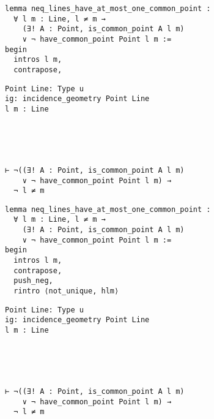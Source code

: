 \begin{frame}[fragile]
	\begin{multicols}{2}
		\begin{lstlisting}
lemma neq_lines_have_at_most_one_common_point :
  ∀ l m : Line, l ≠ m → 
    (∃! A : Point, is_common_point A l m) 
    ∨ ¬ have_common_point Point l m := 
begin
  intros l m,
  contrapose,
\end{lstlisting}
		\columnbreak
		\begin{lstlisting}
Point Line: Type u
ig: incidence_geometry Point Line
l m : Line





⊢ ¬((∃! A : Point, is_common_point A l m) 
    ∨ ¬ have_common_point Point l m) → 
  ¬ l ≠ m
		\end{lstlisting}
	\end{multicols}
\end{frame}










\begin{frame}[fragile]
	\begin{multicols}{2}
		\begin{lstlisting}
lemma neq_lines_have_at_most_one_common_point :
  ∀ l m : Line, l ≠ m → 
    (∃! A : Point, is_common_point A l m) 
    ∨ ¬ have_common_point Point l m := 
begin
  intros l m,
  contrapose,
  push_neg,
  rintro ⟨not_unique, hlm⟩
\end{lstlisting}
		\columnbreak
		\begin{lstlisting}
Point Line: Type u
ig: incidence_geometry Point Line
l m : Line





⊢ ¬((∃! A : Point, is_common_point A l m) 
    ∨ ¬ have_common_point Point l m) → 
  ¬ l ≠ m
		\end{lstlisting}
	\end{multicols}
\end{frame}










